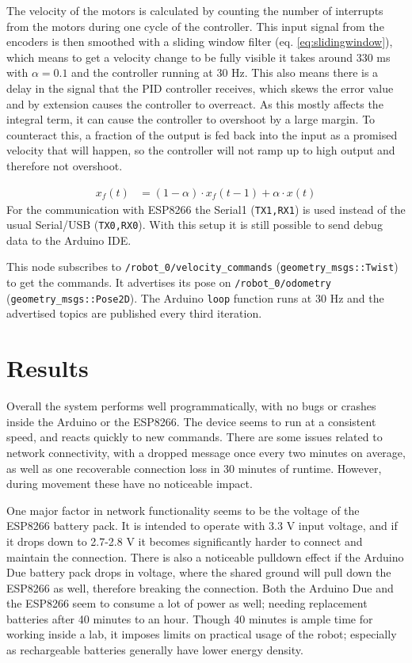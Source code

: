 \documentclass[11pt]{article}
\begin{document}
The velocity of the motors is calculated by counting the number of interrupts from the motors during one cycle of the controller. This input signal from the encoders is then smoothed with a sliding window filter (eq. \vref{eq:slidingwindow}), which
means to get a velocity change to be fully visible it takes around 330 ms with $\alpha=0.1$ and the controller running at 30 Hz. This
also means there is a delay in the signal that the PID controller receives,
which skews the error value and by extension causes the controller to
overreact. As this mostly affects the integral term, it can cause the controller
to overshoot by a large margin. To counteract this, a fraction of the output is
fed back into the input as a promised velocity that will happen, so the
controller will not ramp up to high output and therefore not overshoot.\par

\begin{align}
  x_f(t) &= (1-\alpha) \cdot x_f(t-1)+  \alpha \cdot x(t)  \label{eq:slidingwindow}
\end{align}
For the communication with ESP8266 the Serial1 (\texttt{TX1,RX1}) is used
instead of the usual Serial/USB (\texttt{TX0,RX0}). With this setup it is still
possible to send debug data to the Arduino IDE.\par

This node subscribes to \texttt{/robot\_0/velocity\_commands}
(\texttt{geometry\_msgs::Twist}) to get the commands. It advertises its pose on
\texttt{/robot\_0/odometry} (\texttt{geometry\_msgs::Pose2D}). The Arduino \texttt{loop} function runs at 30 Hz and the advertised topics are published every third iteration.

\section{Results}
Overall the system performs well programmatically, with no bugs or crashes
inside the Arduino or the ESP8266. The device seems to run at a consistent
speed, and reacts quickly to new commands. There are some issues related to
network connectivity, with a dropped message once every two minutes on average,
as well as one recoverable connection loss in 30 minutes of runtime. However,
during movement these have no noticeable impact. \par

One major factor in network functionality seems to be the voltage of the ESP8266
battery pack. It is intended to operate with 3.3 V input voltage, and if it
drops down to 2.7-2.8 V it becomes significantly harder to connect and maintain
the connection. There is also a noticeable pulldown effect if the Arduino Due
battery pack drops in voltage, where the shared ground will pull down the
ESP8266 as well, therefore breaking the connection. Both the Arduino Due and the
ESP8266 seem to consume a lot of power as well; needing replacement batteries
after 40 minutes to an hour. Though 40 minutes is ample time for working inside
a lab, it imposes limits on practical usage of the robot; especially as
rechargeable batteries generally have lower energy density. \par
\end{document}
